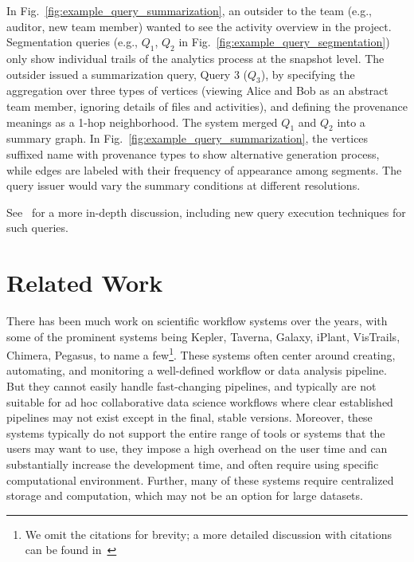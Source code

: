 \documentclass[11pt]{article}
\newcommand{\eat}[1]{}
\newcommand{\nosubcite}[1]{}
\begin{document}
\vspace{-3pt}
\begin{example}
\label{exp:sumop_q3}
In Fig.~\ref{fig:example_query_summarization}, an outsider to the team (e.g., auditor, new team member) wanted to see the activity overview in the project. Segmentation queries (e.g., $Q_1$, $Q_2$ in Fig.~\ref{fig:example_query_segmentation}) only show individual trails of the analytics process at the snapshot level. The outsider issued a summarization query, Query 3 ($Q_3$), by specifying the aggregation over three types of vertices (viewing Alice and Bob as an abstract team member, ignoring details of files and activities), and defining the provenance meanings as a 1-hop neighborhood. The system merged $Q_1$ and $Q_2$ into a summary graph\eat{according to the query}. In Fig.~\ref{fig:example_query_summarization}, the vertices suffixed name with provenance types to show alternative generation process, while edges are labeled with their frequency of appearance among segments. The query issuer would vary the summary conditions at different resolutions.
\end{example}

\noindent
See~\cite{provquery_long} for a more in-depth discussion, including new query execution techniques for such queries.

\section{Related Work}
\label{sec:related}
There has been much work on scientific workflow systems over the years, with some of the prominent systems being Kepler\nosubcite{~\cite{ludascher2006scientific}},
Taverna\nosubcite{~\cite{oinn2006taverna}}, Galaxy\nosubcite{~\cite{giardine2005galaxy}}, iPlant\nosubcite{~\cite{goff2011iplant}},
VisTrails\nosubcite{~\cite{bavoil2005vistrails}}, Chimera\nosubcite{~\cite{foster2002chimera}}, Pegasus\nosubcite{~\cite{DBLP:journals/sp/DeelmanSSBGKMVBGLJK05}}, to name a 
few\footnote{We omit the citations for brevity; a more detailed discussion with citations can be found in~\cite{provdb@hilda17,provquery_long}}. 
These systems often center around creating, automating, and monitoring a well-defined workflow or data analysis pipeline. But they cannot easily handle fast-changing pipelines, and typically are not suitable for ad hoc collaborative data science workflows where clear established pipelines may not exist except in the final, stable versions. Moreover, these systems typically do not support the entire range of tools or systems that the users may want to use, they impose a high overhead on the user time and can substantially increase the development time, and often require using specific computational environment. Further, many of these systems require centralized storage and computation, which may not be an option for large datasets. 
\end{document}

